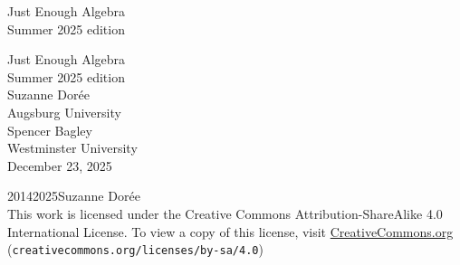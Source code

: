 \documentclass[twoside,11pt,]{book}
\newcommand{\titlepagefont}{\relax}
\numberwithin{equation}{section}
\begin{document}
\raggedbottom
\frontmatter
\thispagestyle{empty}
{\titlepagefont\centering
\vspace*{0.28\textheight}
{\Huge Just Enough Algebra}\\[2\baselineskip]
{\LARGE Summer 2025 edition}\\
}
\clearpage
\thispagestyle{empty}
\null%
\clearpage
\thispagestyle{empty}
{\titlepagefont\centering
\vspace*{0.14\textheight}
{\Huge Just Enough Algebra}\\[\baselineskip]
{\LARGE Summer 2025 edition}\\[3\baselineskip]
{\Large Suzanne Dorée}\\[0.5\baselineskip]
{\Large Augsburg University}\\[3\baselineskip]
{\Large Spencer Bagley}\\[0.5\baselineskip]
{\Large Westminster University}\\[3\baselineskip]
{\Large December 23, 2025}\\}
\clearpage
\thispagestyle{empty}
\hypertarget{frontmatter-4}{}
\noindent\textcopyright{}2014\textendash{}2025\quad{}Suzanne Dorée\\[0.5\baselineskip]
This work is licensed under the Creative Commons Attribution-ShareAlike 4.0 International License. To view a copy of this license, visit \href{http://creativecommons.org/licenses/by-sa/4.0/}{CreativeCommons.org} (\nolinkurl{creativecommons.org/licenses/by-sa/4.0})\par\medskip
{}
\null\clearpage
%
%
\typeout{************************************************}
\typeout{************************************************}
%
\end{document}
